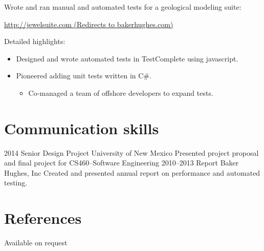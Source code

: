 \documentclass[]{friggeri-cv} %
\begin{document}
\begin{entrylist}
{Wrote and ran manual and automated tests for a geological modeling suite:
\begin{center}
	\href{http://jewelsuite.com}{http://jewelsuite.com (Redirects to bakerhughes.com)}
\end{center}
Detailed highlights:
\begin{itemize}
\item Designed and wrote automated tests in TestComplete using javascript.
\item Pioneered adding unit tests written in C\#.
\begin{itemize}
	\item Co-managed a team of offshore developers to expand tests.
\end{itemize}
\end{itemize}
}
\end{entrylist}


\section{Communication skills}

\begin{entrylist}
\entry
{2014}
{Senior Design Project}
{University of New Mexico}
{Presented project proposal and final project for CS460--Software Engineering}
\entry
{2010--2013}
{Report}
{Baker Hughes, Inc}
{Created and presented annual report on performance and automated testing.}
 \end{entrylist}


\section{References}

Available on request
\end{document}

